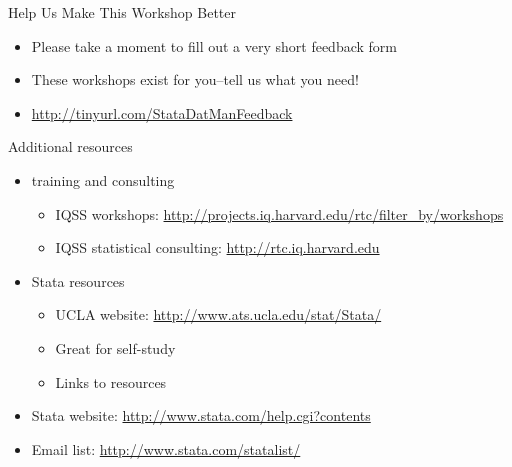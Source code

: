 \documentclass[table,smaller]{beamer}
\begin{document}
\begin{frame}[label=sec-8-1]{Help Us Make This Workshop Better}
\begin{itemize}
\item Please take a moment to fill out a very short feedback form
\item These workshops exist for you--tell us what you need!
\item \url{http://tinyurl.com/StataDatManFeedback}
\end{itemize}
\end{frame}
\begin{frame}[label=sec-8-2]{Additional resources}
\begin{itemize}
\item training and consulting
\begin{itemize}
\item IQSS workshops: \url{http://projects.iq.harvard.edu/rtc/filter_by/workshops}
\item IQSS statistical consulting: \url{http://rtc.iq.harvard.edu}
\end{itemize}

\item Stata resources
\begin{itemize}
\item UCLA website: \url{http://www.ats.ucla.edu/stat/Stata/}
\item Great for self-study
\item Links to resources
\end{itemize}
\item Stata website: \url{http://www.stata.com/help.cgi?contents}
\item Email list: \url{http://www.stata.com/statalist/}
\end{itemize}
\end{frame}
\end{document}
